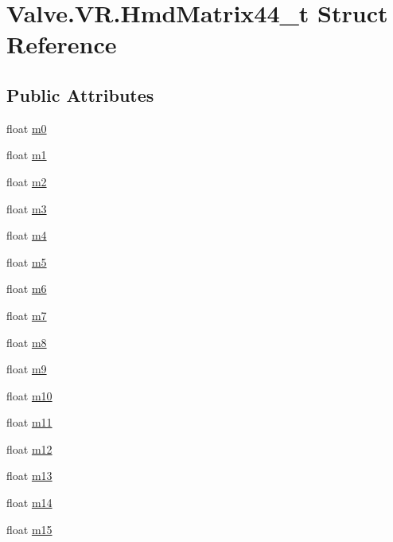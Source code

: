 \hypertarget{struct_valve_1_1_v_r_1_1_hmd_matrix44__t}{}\section{Valve.\+V\+R.\+Hmd\+Matrix44\+\_\+t Struct Reference}
\label{struct_valve_1_1_v_r_1_1_hmd_matrix44__t}
\subsection*{Public Attributes}
\begin{DoxyCompactItemize}
\item 
float \mbox{\hyperlink{struct_valve_1_1_v_r_1_1_hmd_matrix44__t_ac7415074ac2056e88a2bfaa8c48f572b}{m0}}
\item 
float \mbox{\hyperlink{struct_valve_1_1_v_r_1_1_hmd_matrix44__t_addd17bf0232e37474bd0ef94307fc5e4}{m1}}
\item 
float \mbox{\hyperlink{struct_valve_1_1_v_r_1_1_hmd_matrix44__t_a623b56e2310354c7670c0c085bc08a60}{m2}}
\item 
float \mbox{\hyperlink{struct_valve_1_1_v_r_1_1_hmd_matrix44__t_aacd57b61c96ae9ff0c82ada912fb96db}{m3}}
\item 
float \mbox{\hyperlink{struct_valve_1_1_v_r_1_1_hmd_matrix44__t_a38ddbd33c3d5466225abdda840ec1707}{m4}}
\item 
float \mbox{\hyperlink{struct_valve_1_1_v_r_1_1_hmd_matrix44__t_a5c7c3820f0e9ee3c79ca24c8940e4eac}{m5}}
\item 
float \mbox{\hyperlink{struct_valve_1_1_v_r_1_1_hmd_matrix44__t_afcbbd6201f4a3c806eaab010e5a873d2}{m6}}
\item 
float \mbox{\hyperlink{struct_valve_1_1_v_r_1_1_hmd_matrix44__t_a1305972ecdd66f0bf954cb35590321cc}{m7}}
\item 
float \mbox{\hyperlink{struct_valve_1_1_v_r_1_1_hmd_matrix44__t_a511aa10c352b4ea8ef75052d9dfbb7d1}{m8}}
\item 
float \mbox{\hyperlink{struct_valve_1_1_v_r_1_1_hmd_matrix44__t_a933f53f7b2c1e6db489605c6ac024e58}{m9}}
\item 
float \mbox{\hyperlink{struct_valve_1_1_v_r_1_1_hmd_matrix44__t_a4d8951c3477de60abc41090d7bc792d1}{m10}}
\item 
float \mbox{\hyperlink{struct_valve_1_1_v_r_1_1_hmd_matrix44__t_a258861d83965fb6a82db132af122d767}{m11}}
\item 
float \mbox{\hyperlink{struct_valve_1_1_v_r_1_1_hmd_matrix44__t_ac1f26f10152d062727c6f57dcae40208}{m12}}
\item 
float \mbox{\hyperlink{struct_valve_1_1_v_r_1_1_hmd_matrix44__t_a7cec361d99840f28dfc9cfacd3216ac0}{m13}}
\item 
float \mbox{\hyperlink{struct_valve_1_1_v_r_1_1_hmd_matrix44__t_a82a7dd3a81f94aca6c74c1e0a45dc0a3}{m14}}
\item 
float \mbox{\hyperlink{struct_valve_1_1_v_r_1_1_hmd_matrix44__t_a14c67118676ea7c8bed5909b6c19e25d}{m15}}
\end{DoxyCompactItemize}


